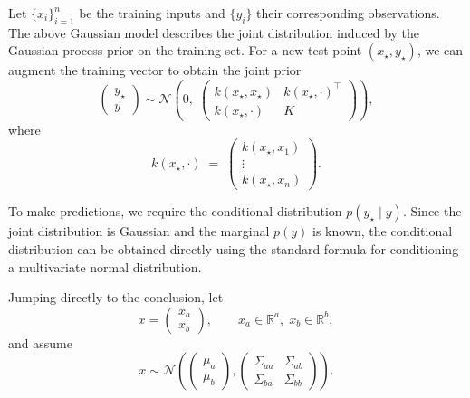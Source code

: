\documentclass[../main]{subfiles}
\begin{document}
Let $\{x_i\}_{i=1}^n$ be the training inputs and $\{y_i\}$ their corresponding
observations.  
The above Gaussian model describes the joint distribution induced by the
Gaussian process prior on the training set.  
For a new test point $(x_\star, y_\star)$, we can augment the training vector to
obtain the joint prior
\begin{equation}
    \begin{pmatrix}
        y_\star \\[2pt]
        y
    \end{pmatrix}
    \sim
    \mathcal N\!\left(
        0,\;
        \begin{pmatrix}
            k(x_\star,x_\star) & k(x_\star,\cdot)^\top \\
            k(x_\star,\cdot)   & K
        \end{pmatrix}
    \right),
\end{equation}
where
\begin{equation}
    k(x_\star,\cdot)
    \;=\;
    \begin{pmatrix}
        k(x_\star,x_1)\\
        \vdots\\
        k(x_\star,x_n)
    \end{pmatrix}.
\end{equation}

To make predictions, we require the conditional distribution $p(y_\star \mid y)$.
Since the joint distribution is Gaussian and the marginal $p(y)$ is known, the
conditional distribution can be obtained directly using the standard formula for
conditioning a multivariate normal distribution.

Jumping directly to the conclusion, let
\begin{equation}
    x=
    \begin{pmatrix}
        x_a\\[2pt]
        x_b
    \end{pmatrix},
    \qquad
    x_a\in\mathbb R^a,\; x_b\in\mathbb R^b,
\end{equation}
and assume
\begin{equation}
    x \sim
    \mathcal N\!\left(
        \begin{pmatrix}
            \mu_a\\[2pt]
            \mu_b
        \end{pmatrix},
        \begin{pmatrix}
            \Sigma_{aa} & \Sigma_{ab} \\
            \Sigma_{ba} & \Sigma_{bb}
        \end{pmatrix}
    \right).
\end{equation}
\end{document}
